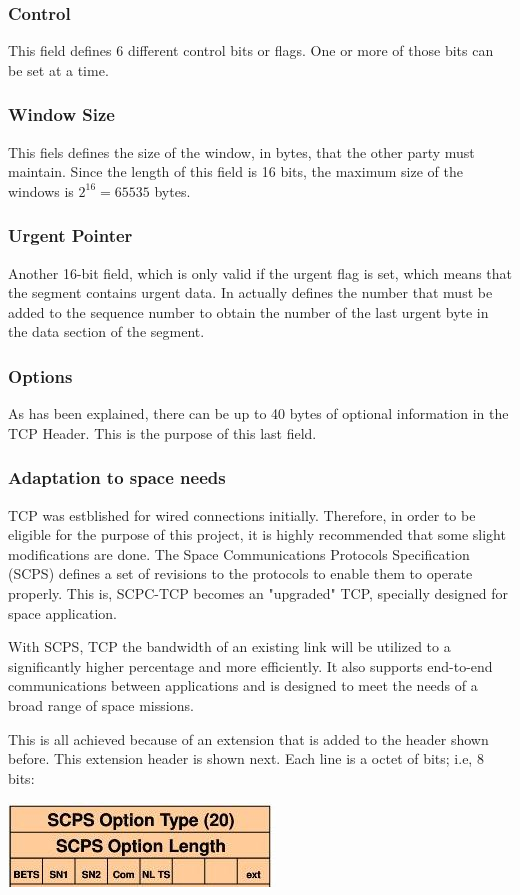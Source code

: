 \subsubsection*{Control}
This field defines 6 different control bits or flags. One or more of those bits can be set at a time. 

\subsubsection*{Window Size}
This fiels defines the size of the window, in bytes, that the other party must maintain. Since the length of this field is 16 bits, the maximum size of the windows is $2^{16}=65535$ bytes.  

\subsubsection*{Urgent Pointer}
Another 16-bit field, which is only valid if the urgent flag is set, which means that the segment contains urgent data. In actually defines the number that must be added to the sequence number to obtain the number of the last urgent byte in the data section of the segment. 

\subsubsection*{Options}
As has been explained, there can be up to 40 bytes of optional information in the TCP Header. This is the purpose of this last field. 

\subsubsection*{Adaptation to space needs}

TCP was estblished for wired connections initially. Therefore, in order to be eligible for the purpose of this project, it is highly recommended that some slight modifications are done. The Space Communications Protocols Specification (SCPS) defines a set of revisions to the protocols to enable them to operate properly. This is, SCPC-TCP becomes an "upgraded" TCP, specially designed for space application.  

With SCPS, TCP the bandwidth of an existing link will be utilized to a significantly higher percentage and more efficiently. It also supports end-to-end communications between applications and is designed to meet the needs of a broad range of space missions. 

This is all achieved because of an extension that is added to the header shown before. This extension header is shown next. Each line is a octet of bits; i.e, 8 bits:

\includegraphics{TCP3(extension)}

  

%
